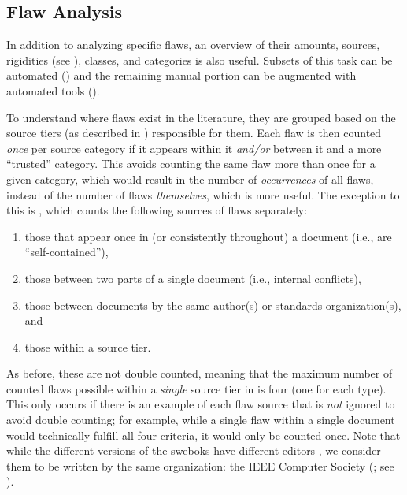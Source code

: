 \subsection{Flaw Analysis}
\label{flaw-analysis}

In addition to analyzing specific flaws, an overview of their amounts,
sources, rigidities (see ), classes, and categories is
also useful. Subsets of this task can be automated ()
and the remaining manual portion can be augmented with automated
tools ().

To understand where flaws exist in the literature, they are
grouped based on the source tiers (as described in )
responsible for them. Each flaw is then counted \emph{once} per source
category if it appears within it \emph{and/or} between it and a more
``trusted'' category. This avoids counting the same flaw more than once
for a given category, which would result in the number of
\emph{occurrences} of all flaws, instead of the number of flaws
\emph{themselves}, which is more useful. The exception to this is
, which counts the following sources
of flaws separately:
\begin{enumerate}
    \item those that appear once in (or consistently throughout) a document
          (i.e., are ``self-contained''),
    \item those between two parts of a single document
          (i.e., internal conflicts),
    \item those between documents by the same author(s) or standards
          organization(s), and
    \item those within a source tier.
\end{enumerate}
As before, these are not double counted, meaning that the maximum number of
counted flaws possible within a \emph{single} source tier in
 is four (one for each type). This only occurs if
there is an example of each flaw source that is \emph{not} ignored to
avoid double counting; for example, while a single flaw within a single
document would technically fulfill all four criteria, it would only be counted
once. Note that while the different versions of the \acfp{swebok} have
different editors \citep{SWEBOK2024,SWEBOK2014}, we consider them to be written
by the same organization: the IEEE Computer Society (\citealp{AboutSWEBOK}; see
).

